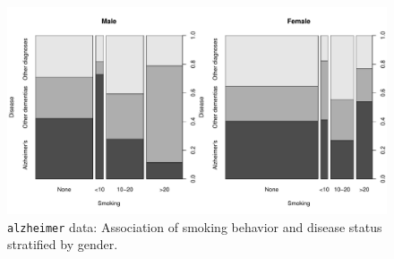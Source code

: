 \documentclass{article}
\newcommand{\Robject}[1]{\texttt{#1}}
\begin{document}
\begin{figure}
\begin{center}
\includegraphics{LegoCondInf-alzheimer-plot}
\caption{\Robject{alzheimer} data: Association of
smoking behavior and disease status stratified by gender. \label{alz-plot}}
\end{center}
\end{figure}
\end{document}
